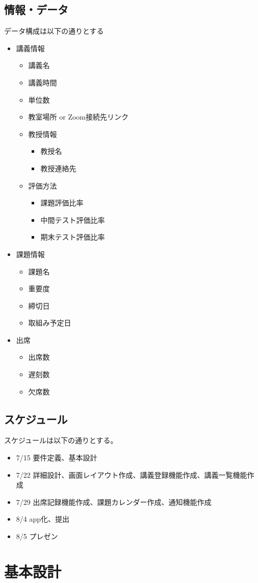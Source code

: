 \documentclass[a4paper, 11pt, titlepage]{jsarticle}
\begin{document}
\subsection{情報・データ}
データ構成は以下の通りとする
\begin{itemize}
\item 講義情報
\begin{itemize}
  \item 講義名
  \item 講義時間
  \item 単位数
  \item 教室場所 or Zoom接続先リンク
  \item 教授情報
  \begin{itemize}
    \item 教授名
    \item 教授連絡先
  \end{itemize}
  \item 評価方法
  \begin{itemize}
    \item 課題評価比率
    \item 中間テスト評価比率
    \item 期末テスト評価比率
  \end{itemize}
\end{itemize}
\item 課題情報
\begin{itemize}
  \item 課題名
  \item 重要度
  \item 締切日
  \item 取組み予定日
\end{itemize}
\item 出席
\begin{itemize}
\item 出席数
\item 遅刻数
\item 欠席数
\end{itemize}
\end{itemize}


\subsection{スケジュール}
スケジュールは以下の通りとする。
\begin{itemize}
\item 7/15 要件定義、基本設計
\item 7/22 詳細設計、画面レイアウト作成、講義登録機能作成、講義一覧機能作成
\item 7/29 出席記録機能作成、課題カレンダー作成、通知機能作成
\item 8/4 app化、提出
\item 8/5 プレゼン
\end{itemize}
\section{基本設計}
\end{document}
